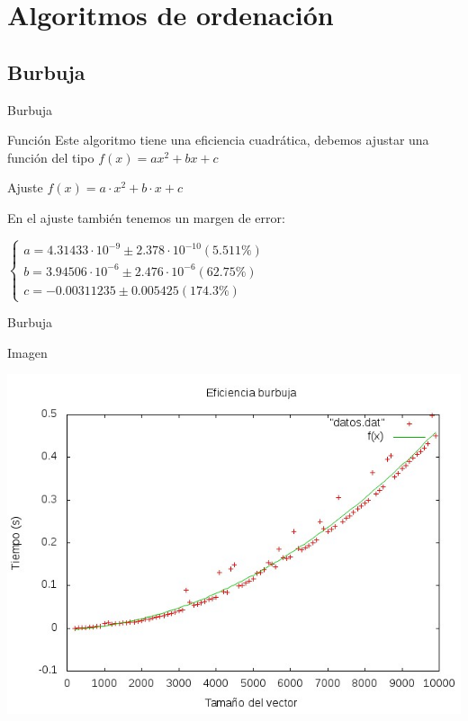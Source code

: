 \documentclass[compress]{beamer}
\begin{document}
\section{Algoritmos de ordenación}
\subsection{Burbuja}
\begin{frame}{Burbuja}
	\begin{block}{Función}
	Este algoritmo tiene una eficiencia cuadrática, debemos ajustar una función del tipo
	$f(x)= ax^2 + bx +c$
	\end{block}
	\pause

	\begin{block}{Ajuste}
	$f(x) = a\cdot x^2 + b\cdot x + c$
	
	En el ajuste también tenemos un margen de error:
	
	$\left\{ \begin{array}{c}
	a               = 4.31433\cdot 10^{-9}      \pm 2.378\cdot 10^{-10}    (5.511\%) \\
	b               = 3.94506\cdot 10^{-6}      \pm 2.476\cdot 10^{-6}    (62.75\%) \\
	c               = -0.00311235     \pm 0.005425     (174.3\%)
	\end{array}\right.$
	\end{block}
\end{frame}

\begin{frame}{Burbuja}	
	\begin{alertblock}{Imagen}
	\begin{center}
	\includegraphics[scale=0.55]{../Graficas/Burbuja/burbujaO0_ruben.jpeg}
	\end{center}
	\end{alertblock}
\end{frame}
\end{document}
